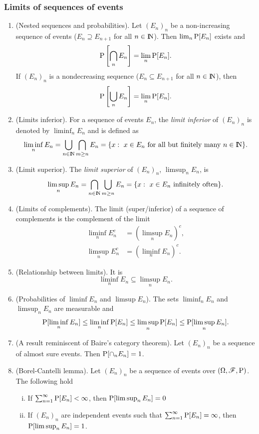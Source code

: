 \documentclass[a4paper,10pt]{article}
\begin{document}
\subsubsection{Limits of sequences of events}
\begin{enumerate}
 \item (Nested sequences and probabilities). Let $(E_n)_n$ be a non-increasing sequence of events ($E_n\supseteq E_{n+1}$ for all $n\in\N$). 
       Then $\lim_n \mathrm{P}[E_n]$ exists and 
       \[
        \mathrm{P}\left[\bigcap_n E_n\right] = \lim_n \mathrm{P}[E_n].
       \]
       If $(E_n)_n$ is a nondecreasing sequence ($E_n \subseteq E_{n+1}$ for all $n\in\N$), then
       \[
        \mathrm{P}\left[\bigcup_n E_n\right] = \lim_n \mathrm{P}[E_n].
       \]


 \item (Limits inferior). For a sequence of events $E_n$, the \textit{limit inferior} of $(E_n)_n$
       is denoted by $\liminf_n E_n$ and is defined as 
       \[
        \liminf_n E_n = \bigcup_{n\in \N}\bigcap_{m\geq n}E_n = \{x:\ x\in E_n\ \text{for all but finitely many } n\in \N\}.
       \]
 \item (Limit superior). The \textit{limit superior} of $(E_n)_n$, $\limsup_n E_n$, is
       \[
        \limsup_n E_n = \bigcap_{n\in \N}\bigcup_{m\geq n}E_n = \{x:\ x\in E_n\ \text{infinitely often} \}.
       \]
 \item (Limits of complements). The limit (super/inferior) of a sequence of complements is the complement of the limit
	\begin{align*}
	 \liminf_n E_n^c &= (\limsup_n E_n)^c,\\
	 \limsup_n E_n^c &= (\liminf_n E_n)^c.
	\end{align*}

 \item (Relationship between limits). It is
       \[
        \liminf_n E_n \subseteq \limsup_n E_n.
       \]
 \item (Probabilities of $\liminf E_n$ and $\limsup E_n$). The sets $\liminf_n E_n$ and $\limsup_n E_n$ are measurable and 
 \[
  \mathrm{P}[\liminf_n E_n] \leq \liminf_n \mathrm{P}[E_n] \leq \limsup_n \mathrm{P}[E_n] \leq \mathrm{P}[\limsup_n E_n].
 \]
 
 \item (A result reminiscent of Baire's category theorem). Let $(E_n)_n$ be a sequence of almost sure events. Then
       $\mathrm{P}[\cap_n E_n] = 1$.

 \item (Borel-Cantelli lemma). Let $(E_n)_n$ be a sequence of events over $(\Omega,\mathscr{F},\mathrm{P})$. The following hold
 \begin{enumerate}[i.]
  \item If $\sum_{n=1}^{\infty}\mathrm{P}[E_n]<\infty$, then $\mathrm{P}[\limsup_n E_n] = 0$
  \item If $(E_n)_n$ are independent events such that $\sum_{n=1}^{\infty}\mathrm{P}[E_n]=\infty$, then
        $\mathrm{P}[\limsup_n E_n] = 1$.
 \end{enumerate}
 

\end{enumerate}
\end{document}
